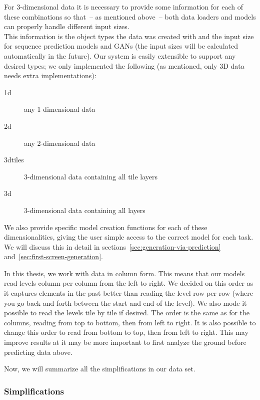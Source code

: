 For 3-dimensional data it is necessary to provide some information for
each of these combinations so that~-- as mentioned above~-- both data
loaders and models can properly handle different input sizes. \\
This information is the object types the data was created with and the
input size for sequence prediction models and GANs (the input sizes
will be calculated automatically in the future). Our system is easily
extensible to support any desired types; we only implemented the
following (as mentioned, only 3D data needs extra implementations):
\begin{description}
\item[1d] any 1-dimensional data
\item[2d] any 2-dimensional data
\item[3dtiles] 3-dimensional data containing all tile layers
\item[3d] 3-dimensional data containing all layers
\end{description}
We also provide specific model creation functions for each of these
dimensionalities, giving the user simple access to the correct model
for each task. We will discuss this in detail in
sections~\ref{sec:generation-via-prediction}
and~\ref{sec:first-screen-generation}.

In this thesis, we work with data in column form. This means that our
models read levels column per column from the left to right. We
decided on this order as it captures elements in the past better than
reading the level row per row (where you go back and forth between the
start and end of the level). We also mode it possible to read the
levels tile by tile if desired. The order is the same as for the
columns, reading from top to bottom, then from left to right. It is
also possible to change this order to read from bottom to top, then
from left to right. This may improve results at it may be more
important to first analyze the ground before predicting data above.

Now, we will summarize all the simplifications in our data set.

\subsubsection{Simplifications}
\label{sec:simplifications}


